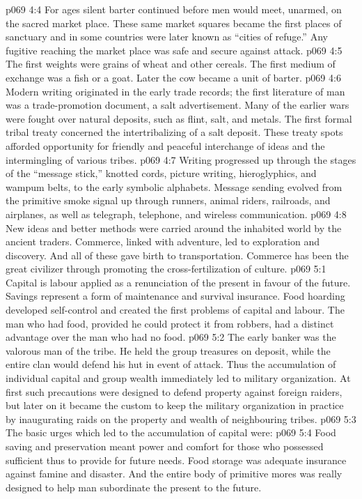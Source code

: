 \vs p069 4:4 For ages silent barter continued before men would meet, unarmed, on the sacred market place. These same market squares became the first places of sanctuary and in some countries were later known as “cities of refuge.” Any fugitive reaching the market place was safe and secure against attack.
\vs p069 4:5 \pc The first weights were grains of wheat and other cereals. The first medium of exchange was a fish or a goat. Later the cow became a unit of barter.
\vs p069 4:6 Modern writing originated in the early trade records; the first literature of man was a trade\hyp{}promotion document, a salt advertisement. Many of the earlier wars were fought over natural deposits, such as flint, salt, and metals. The first formal tribal treaty concerned the intertribalizing of a salt deposit. These treaty spots afforded opportunity for friendly and peaceful interchange of ideas and the intermingling of various tribes.
\vs p069 4:7 Writing progressed up through the stages of the “message stick,” knotted cords, picture writing, hieroglyphics, and wampum belts, to the early symbolic alphabets. Message sending evolved from the primitive smoke signal up through runners, animal riders, railroads, and airplanes, as well as telegraph, telephone, and wireless communication.
\vs p069 4:8 New ideas and better methods were carried around the inhabited world by the ancient traders. Commerce, linked with adventure, led to exploration and discovery. And all of these gave birth to transportation. Commerce has been the great civilizer through promoting the cross\hyp{}fertilization of culture.
\vs p069 5:1 Capital is labour applied as a renunciation of the present in favour of the future. Savings represent a form of maintenance and survival insurance. Food hoarding developed self\hyp{}control and created the first problems of capital and labour. The man who had food, provided he could protect it from robbers, had a distinct advantage over the man who had no food.
\vs p069 5:2 The early banker was the valorous man of the tribe. He held the group treasures on deposit, while the entire clan would defend his hut in event of attack. Thus the accumulation of individual capital and group wealth immediately led to military organization. At first such precautions were designed to defend property against foreign raiders, but later on it became the custom to keep the military organization in practice by inaugurating raids on the property and wealth of neighbouring tribes.
\vs p069 5:3 The basic urges which led to the accumulation of capital were:
\vs p069 5:4 \bibnobreakspace {} Food saving and preservation meant power and comfort for those who possessed sufficient  thus to provide for future needs. Food storage was adequate insurance against famine and disaster. And the entire body of primitive mores was really designed to help man subordinate the present to the future.
